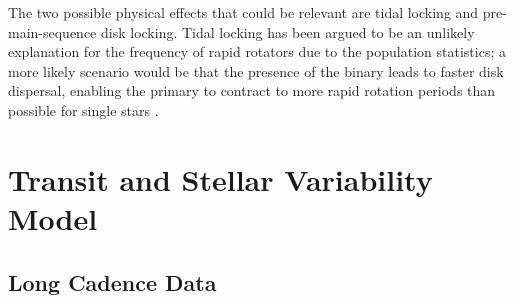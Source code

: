 \documentclass[12pt,modern,twocolumn,tighten]{aastex63}
\begin{document}
The two possible physical effects that could be relevant are tidal
locking and pre-main-sequence disk locking.  Tidal locking has been
argued to be an unlikely explanation for the frequency of rapid
rotators due to the population statistics; a more likely scenario
would be that the presence of the binary leads to faster disk
dispersal, enabling the primary to contract to more rapid rotation
periods than possible for single stars
\citep{meibom_effect_2007,bouma_cluster_2020}.



\section{Transit and Stellar Variability Model}
\label{app:gptransit}

\subsection{Long Cadence Data}
\end{document}
